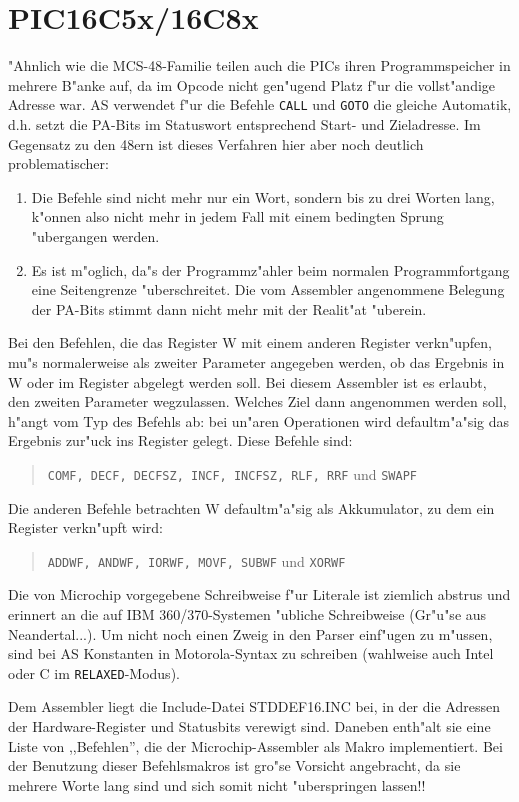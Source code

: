 \documentclass[12pt,a4paper,twoside]{report}
\newcommand{\tty}[1]{{\tt #1}}
\begin{document}
{%

\section{PIC16C5x/16C8x}

"Ahnlich wie die MCS-48-Familie teilen auch die PICs ihren
Programmspeicher in mehrere B"anke auf, da im Opcode nicht gen"ugend Platz
f"ur die vollst"andige Adresse war.  AS verwendet f"ur die Befehle \tty{CALL}
und \tty{GOTO} die gleiche Automatik, d.h. setzt die PA-Bits im
Statuswort entsprechend Start- und Zieladresse.  Im Gegensatz zu den 48ern
ist dieses Verfahren hier aber noch deutlich problematischer:
\begin{enumerate}
\item{Die Befehle sind nicht mehr nur ein Wort, sondern bis zu drei Worten
      lang, k"onnen also nicht mehr in jedem Fall mit einem bedingten Sprung
      "ubergangen werden.}
\item{Es ist m"oglich, da"s der Programmz"ahler beim normalen
      Programmfortgang eine Seitengrenze "uberschreitet.  Die vom Assembler
      angenommene Belegung der PA-Bits stimmt dann nicht mehr mit der
      Realit"at "uberein.}
\end{enumerate}
Bei den Befehlen, die das Register W mit einem anderen Register
verkn"upfen, mu"s normalerweise als zweiter Parameter angegeben werden, ob
das Ergebnis in W oder im Register abgelegt werden soll.  Bei diesem
Assembler ist es erlaubt, den zweiten Parameter wegzulassen.  Welches Ziel
dann angenommen werden soll, h"angt vom Typ des Befehls ab: bei un"aren
Operationen wird defaultm"a"sig das Ergebnis zur"uck ins Register gelegt.
Diese Befehle sind:
\begin{quote}
{\tt COMF, DECF, DECFSZ, INCF, INCFSZ, RLF, RRF} und {\tt SWAPF}
\end{quote}
Die anderen Befehle betrachten W defaultm"a"sig als Akkumulator, zu dem ein
Register verkn"upft wird:
\begin{quote}
{\tt ADDWF, ANDWF, IORWF, MOVF, SUBWF} und {\tt XORWF}
\end{quote}
\par
Die von Microchip vorgegebene Schreibweise f"ur Literale ist ziemlich
abstrus und erinnert an die auf IBM 360/370-Systemen "ubliche Schreibweise
(Gr"u"se aus Neandertal...).  Um nicht noch einen Zweig in den Parser
einf"ugen zu m"ussen, sind bei AS Konstanten in
Motorola-Syntax zu schreiben (wahlweise auch Intel oder C im \tty{RELAXED}-Modus).
\par
Dem Assembler liegt die Include-Datei STDDEF16.INC bei, in der die Adressen
der Hardware-Register und Statusbits verewigt sind.  Daneben enth"alt sie
eine Liste von ,,Befehlen'', die der Microchip-Assembler als Makro
implementiert.  Bei der Benutzung dieser Befehlsmakros ist gro"se Vorsicht
angebracht, da sie mehrere Worte lang sind und sich somit nicht "uberspringen
lassen!!

}
\end{document}
